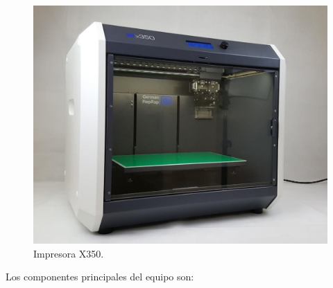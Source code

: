\begin{figure}[H]
\centering
\includegraphics[scale=0.4]{images/x350pormientras.jpg}
\caption{Impresora X350.}
\end{figure}

Los componentes principales del equipo son:

